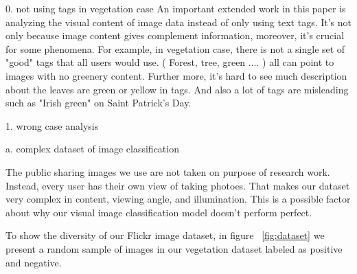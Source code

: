 
0. not using tags in vegetation case
An important extended work in this paper is analyzing the visual content of image data instead of
only using text tags. It's not only because image content gives complement information, moreover,
 it's crucial for some phenomena. For example, in vegetation case, 
there is not a single set of "good"
tags that all users would use. ( Forest, tree, green .... ) all can point to images with no greenery content.
Further more, it's hard to see much description about the leaves are green or yellow in tags.
And also a lot of tags are misleading such as "Irish green" on Saint Patrick's Day. 

1. wrong case analysis

a. complex dataset of image classification


The public sharing images we use are not taken on purpose of research work. Instead, every user has their own view of taking photoes. That makes our dataset very complex in content, viewing angle, and illumination. This is a possible factor about why our visual image classification model doesn't perform perfect. 

To show the diversity of our Flickr image dataset, in figure ~\ref{fig:dataset} we present a random sample of images in our vegetation dataset labeled as positive and negative.

